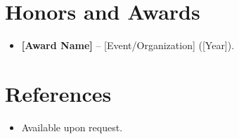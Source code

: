 \documentclass[11pt,a4paper,sans]{moderncv}
\begin{document}
\section{Honors and Awards}
\vspace{1pt}
\begin{itemize}
\item{\textbf{[Award Name]} -- [Event/Organization] ([Year]).}
\end{itemize}


\section{References}
\vspace{1pt}
\begin{itemize}
\item{Available upon request.}
\end{itemize}
\end{document}
